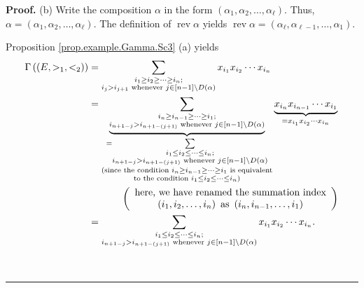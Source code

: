 \documentclass[numbers=enddot,12pt,final,onecolumn,notitlepage,abstracton]{scrartcl}
\theoremstyle{definition}
\newenvironment{proof}[1][Proof]{\noindent\textbf{#1.} }{\ \rule{0.5em}{0.5em}}
\let\sumnonlimits\sum
\renewcommand{\sum}{\sumnonlimits\limits}
\newenvironment{verlong}{}{}
\begin{document}
\begin{verlong}
\begin{footnotesize}
\begin{proof}
(b) Write the composition $\alpha$ in the form $\left(  \alpha_{1},\alpha
_{2},\ldots,\alpha_{\ell}\right)  $. Thus, $\alpha=\left(  \alpha_{1}%
,\alpha_{2},\ldots,\alpha_{\ell}\right)  $. The definition of
$\operatorname*{rev}\alpha$ yields $\operatorname*{rev}\alpha=\left(
\alpha_{\ell},\alpha_{\ell-1},\ldots,\alpha_{1}\right)  $.

Proposition \ref{prop.example.Gamma.Sc3} (a) yields%
\begin{align}
\Gamma\left(  \left(  E,>_{1},<_{2}\right)  \right)   &  =\sum
_{\substack{i_{1}\geq i_{2}\geq\cdots\geq i_{n};\\i_{j}>i_{j+1}\text{ whenever
}j\in\left[  n-1\right]  \setminus D\left(  \alpha\right)  }}x_{i_{1}}%
x_{i_{2}}\cdots x_{i_{n}}\nonumber\\
&  =\underbrace{\sum_{\substack{i_{n}\geq i_{n-1}\geq\cdots\geq i_{1}%
;\\i_{n+1-j}>i_{n+1-\left(  j+1\right)  }\text{ whenever }j\in\left[
n-1\right]  \setminus D\left(  \alpha\right)  }}}_{\substack{=\sum
_{\substack{i_{1}\leq i_{2}\leq\cdots\leq i_{n};\\i_{n+1-j}>i_{n+1-\left(
j+1\right)  }\text{ whenever }j\in\left[  n-1\right]  \setminus D\left(
\alpha\right)  }}\\\text{(since the condition }i_{n}\geq i_{n-1}\geq\cdots\geq
i_{1}\text{ is equivalent}\\\text{to the condition }i_{1}\leq i_{2}\leq
\cdots\leq i_{n}\text{)}}}\underbrace{x_{i_{n}}x_{i_{n-1}}\cdots x_{i_{1}}%
}_{=x_{i_{1}}x_{i_{2}}\cdots x_{i_{n}}}\nonumber\\
&  \ \ \ \ \ \ \ \ \ \ \left(
\begin{array}
[c]{c}%
\text{here, we have renamed the summation index}\\
\left(  i_{1},i_{2},\ldots,i_{n}\right)  \text{ as }\left(  i_{n}%
,i_{n-1},\ldots,i_{1}\right)
\end{array}
\right) \nonumber\\
&  =\sum_{\substack{i_{1}\leq i_{2}\leq\cdots\leq i_{n};\\i_{n+1-j}%
>i_{n+1-\left(  j+1\right)  }\text{ whenever }j\in\left[  n-1\right]
\setminus D\left(  \alpha\right)  }}x_{i_{1}}x_{i_{2}}\cdots x_{i_{n}}.
\label{pf.prop.example.Gamma.Sc3.b.1}%
\end{align}



\end{proof}
\end{footnotesize}
\end{verlong}
\end{document}
